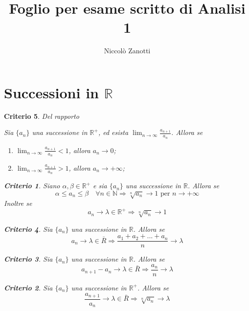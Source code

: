 \documentclass[a4paper, titlepage]{report}%
\theoremstyle{definition} %
\theoremstyle{plain}
\theoremstyle{plain}
\theoremstyle{remark}
\theoremstyle{remark}
\theoremstyle{plain}
\newtheorem*{criterio}{Criterio}
\theoremstyle{plain}
\theoremstyle{plain}
\theoremstyle{plain}
\theoremstyle{plain}
\begin{document}
    \title{Foglio per esame scritto di Analisi 1}
    \author{Niccolò Zanotti}
    \maketitle


\section*{Successioni in $\mathbb{R}$}
\begin{criterio}{Del rapporto}

    Sia ${\{ a_n \}}$ una successione in $\mathbb{R^+}$, ed esista
     $\lim_{n \to \infty} \frac{a_{n+1}}{a_n}$. Allora se 
     \begin{enumerate}
         \item $\lim_{n \to \infty} \frac{a_{n+1}}{a_n} < 1$,
               allora $a_n \rightarrow 0$;
        \item $\lim_{n \to \infty} \frac{a_{n+1}}{a_n} > 1$,
        allora $a_n \rightarrow +\infty$;
     \end{enumerate}
\begin{criterio}{}
    
    Siano $\alpha,\beta \in \mathbb{R^+}$ e sia ${\{ a_n \}}$ 
    una successione in $\mathbb{R}$. Allora se
\[
    \alpha \leq a_n \leq \beta \quad \forall n \in \mathbb{N}  
    \Longrightarrow \sqrt[n]{a_n} \rightarrow 1 \text{ per }
     n \rightarrow +\infty
\]
Inoltre se
\[
    a_n \rightarrow \lambda \in \mathbb{R^+} \Longrightarrow 
    \sqrt[n]{a_n} \rightarrow 1
\]
\end{criterio}
\begin{criterio}{}
    
    Sia $\{a_n\}$ una successione in $\mathbb{R}$. Allora se
\[
     a_n \rightarrow \lambda \in \bar{R} \Longrightarrow 
     \frac{a_1+a_2+ ... + a_n}{n} \rightarrow \lambda  
\]
\begin{criterio}
    
    Sia $\{a_n\}$ una successione in $\mathbb{R}$. Allora se
\[
     a_{n+1}-a_n \rightarrow \lambda \in \bar{R} \Longrightarrow 
     \frac{a_n}{n} \rightarrow \lambda       
\]
\begin{criterio}
    
    Sia $\{a_n\}$ una successione in $\mathbb{R^+}$. Allora se
\[
     \frac{a_{n+1}}{a_n} \rightarrow \lambda \in \bar{R} \Longrightarrow
     \sqrt[n]{a_n} \rightarrow \lambda    
\]

\end{criterio}
    
\end{criterio}


\end{criterio}

   

\end{criterio}
\end{document}
